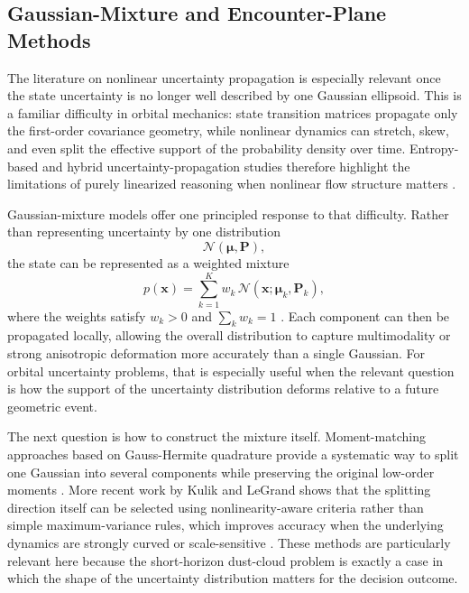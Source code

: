 \subsection{Gaussian-Mixture and Encounter-Plane Methods}
The literature on nonlinear uncertainty propagation is especially relevant once the state uncertainty is no longer well described by one Gaussian ellipsoid. This is a familiar difficulty in orbital mechanics: state transition matrices propagate only the first-order covariance geometry, while nonlinear dynamics can stretch, skew, and even split the effective support of the probability density over time. Entropy-based and hybrid uncertainty-propagation studies therefore highlight the limitations of purely linearized reasoning when nonlinear flow structure matters \cite{demars2013entropy,LUO201723}.

Gaussian-mixture models offer one principled response to that difficulty. Rather than representing uncertainty by one distribution
\begin{equation}
    \mathcal{N}(\boldsymbol{\mu},\mathbf{P}),
\end{equation}
the state can be represented as a weighted mixture
\begin{equation}
    p(\mathbf{x}) = \sum_{k=1}^{K} w_k \, \mathcal{N}(\mathbf{x};\boldsymbol{\mu}_k,\mathbf{P}_k),
\end{equation}
where the weights satisfy \(w_k>0\) and \(\sum_k w_k = 1\) \cite{horwood2011gaussian,vittaldev2016gmm}. Each component can then be propagated locally, allowing the overall distribution to capture multimodality or strong anisotropic deformation more accurately than a single Gaussian. For orbital uncertainty problems, that is especially useful when the relevant question is how the support of the uncertainty distribution deforms relative to a future geometric event.

The next question is how to construct the mixture itself. Moment-matching approaches based on Gauss-Hermite quadrature provide a systematic way to split one Gaussian into several components while preserving the original low-order moments \cite{legrand2022splitting}. More recent work by Kulik and LeGrand shows that the splitting direction itself can be selected using nonlinearity-aware criteria rather than simple maximum-variance rules, which improves accuracy when the underlying dynamics are strongly curved or scale-sensitive \cite{kulik2024wussadl,KulikLeGrand2026}. These methods are particularly relevant here because the short-horizon dust-cloud problem is exactly a case in which the shape of the uncertainty distribution matters for the decision outcome.

